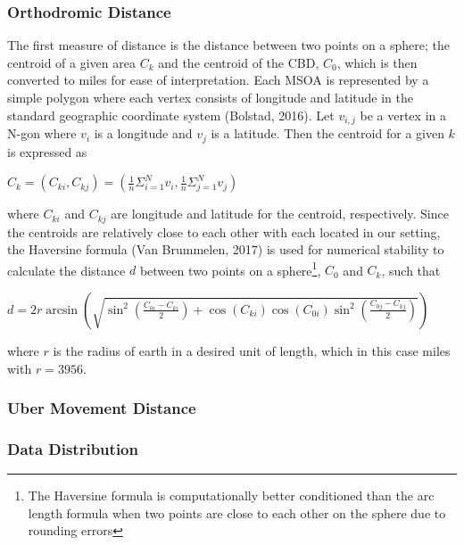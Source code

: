 \documentclass{article}
\begin{document}
\subsubsection{Orthodromic Distance}
The first measure of distance is the distance between two points on a sphere; the centroid of a given area $C_k$ and the centroid of the CBD, $C_0$, which is then converted to miles for ease of interpretation. Each MSOA is represented by a simple polygon where each vertex consists of longitude and latitude in the standard geographic coordinate system (Bolstad, 2016). Let $v_{i,j}$ be a vertex in a N-gon where $v_i$ is a longitude and $v_j$ is a latitude. Then the centroid for a given $k$ is expressed as 

\begin{center}
    $C_k = (C_{ki}, C_{kj})  = (\frac{1}{n} \Sigma_{i=1}^{N} v_i, \frac{1}{n} \Sigma_{j=1}^{N} v_j) $
\end{center}

where $C_{ki}$ and $C_{kj}$ are longitude and latitude for the centroid, respectively. Since the centroids are relatively close to each other with each located in our setting, the Haversine formula (Van Brummelen, 2017) is used for numerical stability to calculate the distance $d$ between two points on a sphere\footnote{The Haversine formula is computationally better conditioned than the arc length formula when two points are close to each other on the sphere due to rounding errors}, $C_0$ and $C_k$, such that

\begin{center}
    $d =2 r \arcsin \left(\sqrt{\sin ^{2}\left(\frac{C_{0i}-C_{ki}}{2}\right)+\cos \left(C_{ki}\right) \cos \left(C_{0i}\right) \sin ^{2}\left(\frac{C_{0j}-C_{kj}}{2}\right)}\right)$
\end{center}
where $r$ is the radius of earth in a desired unit of length, which in this case miles with $r = 3956$. 

\subsubsection{Uber Movement Distance}

\subsubsection{Data Distribution}
\end{document}
